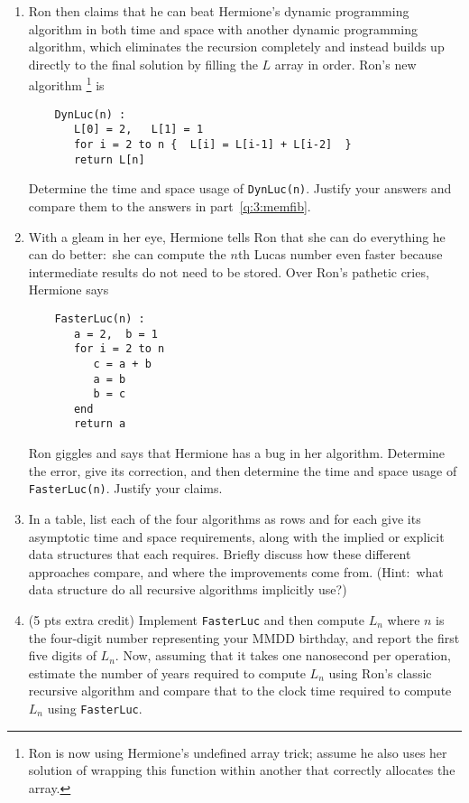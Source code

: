 \documentclass[12pt]{article}
\begin{document}
\begin{enumerate}
\begin{enumerate}
	\item Ron then claims that he can beat Hermione's dynamic programming algorithm in both time and space with another dynamic programming algorithm, which eliminates the recursion completely and instead builds up directly to the final solution by filling the $L$ array in order. Ron's new algorithm%
	\footnote{Ron is now using Hermione's undefined array trick; assume he also uses her solution of wrapping this function within another that correctly allocates the array.}
	is
	\begin{small}
	\begin{verbatim}
	DynLuc(n) :
	   L[0] = 2,   L[1] = 1
	   for i = 2 to n {  L[i] = L[i-1] + L[i-2]  }
	   return L[n]
	\end{verbatim}
	\end{small}
	Determine the time and space usage of \verb+DynLuc(n)+. Justify your answers and compare them to the answers in part~\eqref{q:3:memfib}.

	\item With a gleam in her eye, Hermione tells Ron that she can do everything he can do better:\ she can compute the $n$th Lucas number even faster because intermediate results do not need to be stored. Over Ron's pathetic cries, Hermione says
	\begin{small}
	\begin{verbatim}
	FasterLuc(n) :
	   a = 2,  b = 1
	   for i = 2 to n
	      c = a + b
	      a = b
	      b = c
	   end
	   return a
	\end{verbatim}
	\end{small}
	Ron giggles and says that Hermione has a bug in her algorithm. Determine the error, give its correction, and then determine the time and space usage of \verb+FasterLuc(n)+. Justify your claims.
	
	
	\item In a table, list each of the four algorithms as rows and for each give its asymptotic time and space requirements, along with the implied or explicit data structures that each requires. Briefly discuss how these different approaches compare, and where the improvements come from. (Hint:\ what data structure do all recursive algorithms implicitly use?)

	\item (5 pts extra credit) Implement {\tt FasterLuc} and then compute $L_{n}$ where $n$ is the four-digit number representing your MMDD birthday, and report the first five digits of $L_{n}$. Now, assuming that it takes one nanosecond per operation, estimate the number of years required to compute $L_{n}$ using Ron's classic recursive algorithm and compare that to the clock time required to compute $L_{n}$ using {\tt FasterLuc}.
	\end{enumerate}




	
	

\end{enumerate}
\end{document}
